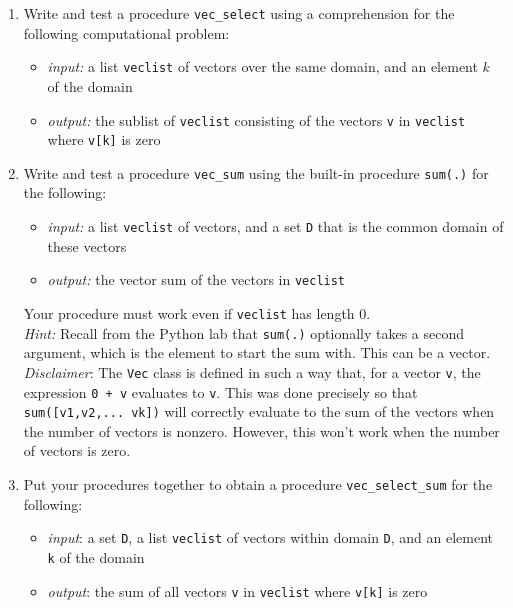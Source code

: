 \documentclass[
  letterpaper,
  DIV=11,
  numbers=noendperiod]{scrartcl}
\providecommand{\tightlist}{%
  \setlength{\itemsep}{0pt}\setlength{\parskip}{0pt}}\usepackage{longtable,booktabs,array}
\begin{document}
\begin{enumerate}
\def\labelenumi{\arabic{enumi}.}
\item
  Write and test a procedure \texttt{vec\_select} using a comprehension
  for the following computational problem:

  \begin{itemize}
  \tightlist
  \item
    \emph{input:} a list \texttt{veclist} of vectors over the same
    domain, and an element \(k\) of the domain
  \item
    \emph{output:} the sublist of \texttt{veclist} consisting of the
    vectors \texttt{v} in \texttt{veclist} where \texttt{v{[}k{]}} is
    zero
  \end{itemize}
\item
  Write and test a procedure \texttt{vec\_sum} using the built-in
  procedure \texttt{sum(.)} for the following:

  \begin{itemize}
  \tightlist
  \item
    \emph{input:} a list \texttt{veclist} of vectors, and a set
    \texttt{D} that is the common domain of these vectors
  \item
    \emph{output:} the vector sum of the vectors in \texttt{veclist}
  \end{itemize}

  Your procedure must work even if \texttt{veclist} has length 0.\\
  \emph{Hint:} Recall from the Python lab that \texttt{sum(.)}
  optionally takes a second argument, which is the element to start the
  sum with. This can be a vector.\\
  \emph{Disclaimer}: The \texttt{Vec} class is defined in such a way
  that, for a vector \texttt{v}, the expression \texttt{0\ +\ v}
  evaluates to \texttt{v}. This was done precisely so that
  \texttt{sum({[}v1,v2,...\ vk{]})} will correctly evaluate to the sum
  of the vectors when the number of vectors is nonzero. However, this
  won't work when the number of vectors is zero.
\item
  Put your procedures together to obtain a procedure
  \texttt{vec\_select\_sum} for the following:

  \begin{itemize}
  \tightlist
  \item
    \emph{input}: a set \texttt{D}, a list \texttt{veclist} of vectors
    within domain \texttt{D}, and an element \texttt{k} of the domain
  \item
    \emph{output}: the sum of all vectors \texttt{v} in \texttt{veclist}
    where \texttt{v{[}k{]}} is zero
  \end{itemize}
\end{enumerate}
\end{document}
